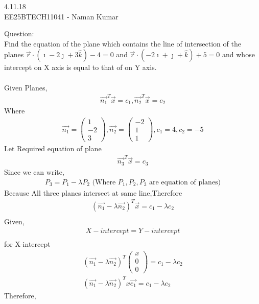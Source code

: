 \documentclass[journal]{IEEEtran}
\author{EE25BTECH11041-Naman Kumar }
\begin{document}
\begin{center}
    \huge{4.11.18}\\
    \large{EE25BTECH11041 - Naman Kumar}
\end{center}
Question:\\
Find the equation of the plane which contains the line of intersection of the planes $\vec{r}\cdot(\imath-2\jmath+3\hat{k})-4=0$ and  $\vec{r}\cdot(-2\imath+\jmath+\hat{k})+5=0$ and whose intercept on X axis is equal to that of on Y axis.\\
\solution \\
Given Planes,
\begin{align}
    \vec{n_1}^T\vec{x}=c_1,\vec{n_2}^T\vec{x}=c_2
\end{align}
Where
\begin{align}
\vec{n_1}=\begin{pmatrix}1\\-2\\3\end{pmatrix},\vec{n_2}=\begin{pmatrix}-2\\1\\1\end{pmatrix},c_1=4,c_2=-5
\end{align}
Let Required equation of plane
\begin{align}
    \vec{n_3}^T\vec{x}=c_3
\end{align}
Since we can write,
\begin{align}
P_3=P_1-\lambda P_2 \text{ (Where $P_1,P_2,P_3$ are equation of planes)}
\end{align}
Because All three planes intersect at same line,Therefore
\begin{align}
    (\vec{n_1}-\lambda \vec{n_2})^T\vec{x}=c_1-\lambda c_2\\
\end{align}
Given,
\begin{align}
    X-intercept=Y-intercept\\
\end{align}
for X-intercept
\begin{align}
    (\vec{n_1}-\lambda \vec{n_2})^T\begin{pmatrix}x\\0\\0\end{pmatrix}=c_1-\lambda c_2\\
    (\vec{n_1}-\lambda \vec{n_2})^Tx\vec{e_1}=c_1-\lambda c_2
\end{align}
Therefore,
\end{document}
